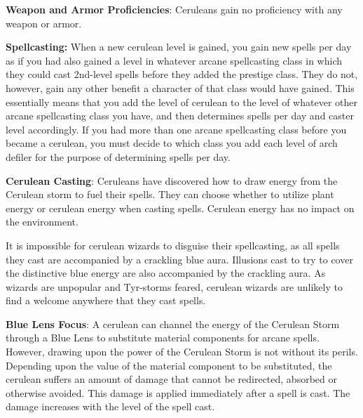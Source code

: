 {
\textbf{Weapon and Armor Proficiencies}: Ceruleans gain no proficiency with any weapon or armor.

\textbf{Spellcasting:} When a new cerulean level is gained, you gain new spells per day as if you had also gained a level in whatever arcane spellcasting class in which they could cast 2nd-level spells before they added the prestige class. They do not, however, gain any other benefit a character of that class would have gained. This essentially means that you add the level of cerulean to the level of whatever other arcane spellcasting class you have, and then determines spells per day and caster level accordingly. If you had more than one arcane spellcasting class before you became a cerulean, you must decide to which class you add each level of arch defiler for the purpose of determining spells per day.

\textbf{Cerulean Casting}: Ceruleans have discovered how to draw energy from the Cerulean storm to fuel their spells. They can choose whether to utilize plant energy or cerulean energy when casting spells. Cerulean energy has no impact on the environment.

It is impossible for cerulean wizards to disguise their spellcasting, as all spells they cast are accompanied by a crackling blue aura. Illusions cast to try to cover the distinctive blue energy are also accompanied by the crackling aura. As wizards are unpopular and Tyr-storms feared, cerulean wizards are unlikely to find a welcome anywhere that they cast spells.

\textbf{Blue Lens Focus}: A cerulean can channel the energy of the Cerulean Storm through a Blue Lens to substitute material components for arcane spells. However, drawing upon the power of the Cerulean Storm is not without its perils. Depending upon the value of the material component to be substituted, the cerulean suffers an amount of damage that cannot be redirected, absorbed or otherwise avoided. This damage is applied immediately after a spell is cast. The damage increases with the level of the spell cast.


}
